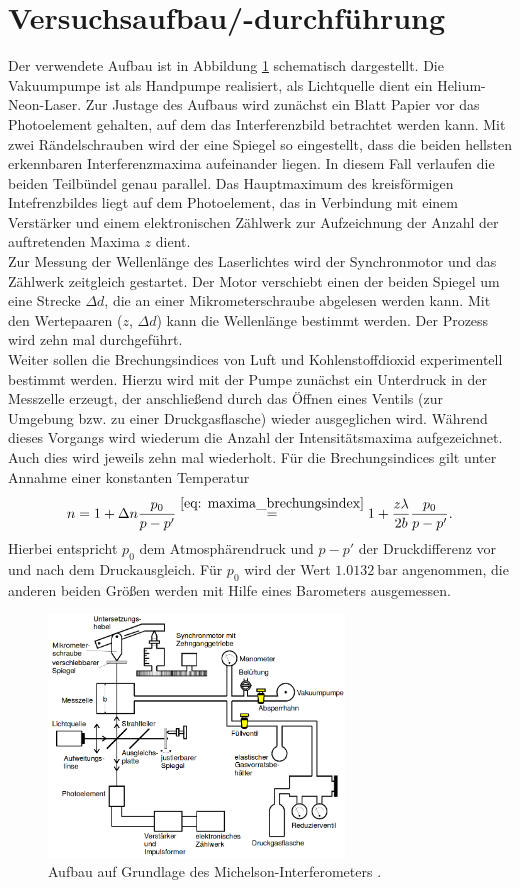\section{Versuchsaufbau/-durchführung}
Der verwendete Aufbau ist in Abbildung \ref{fig: aufbau} schematisch dargestellt. Die Vakuumpumpe ist als Handpumpe
realisiert, als Lichtquelle dient ein Helium-Neon-Laser. Zur Justage des Aufbaus wird zunächst ein Blatt Papier vor das Photoelement gehalten,
auf dem das Interferenzbild betrachtet werden kann. Mit zwei Rändelschrauben wird der eine Spiegel so eingestellt,  %
dass die beiden hellsten erkennbaren Interferenzmaxima
aufeinander liegen. In diesem Fall verlaufen die beiden Teilbündel genau parallel. Das Hauptmaximum des kreisförmigen Intefrenzbildes %
liegt auf dem Photoelement, das in Verbindung mit einem Verstärker und einem elektronischen Zählwerk zur Aufzeichnung der Anzahl
der auftretenden Maxima $z$ dient.\\
Zur Messung der Wellenlänge des Laserlichtes wird der Synchronmotor und das Zählwerk zeitgleich gestartet. Der Motor verschiebt einen
der beiden Spiegel um eine Strecke $\Delta d$, die an einer Mikrometerschraube abgelesen werden kann. Mit den Wertepaaren ($z$, $\Delta d$) kann
die Wellenlänge bestimmt werden. Der Prozess wird zehn mal durchgeführt. \\
Weiter sollen die Brechungsindices von Luft und Kohlenstoffdioxid experimentell bestimmt werden. Hierzu  wird mit der Pumpe zunächst ein Unterdruck
in der Messzelle erzeugt, der anschließend
durch das Öffnen eines Ventils (zur Umgebung bzw. zu einer Druckgasflasche) wieder ausgeglichen wird. Während dieses Vorgangs wird wiederum die
Anzahl der Intensitätsmaxima aufgezeichnet. Auch dies wird jeweils zehn mal wiederholt. Für die Brechungsindices gilt unter Annahme einer konstanten
Temperatur
\begin{equation}
  \label{eq: brechungsindex}
  n = 1 + \Delta n \frac{p_0}{p - p'} \overset{\eqref{eq: maxima_brechungsindex}}{=} 1 + \frac{z \lambda}{2b} \frac{p_0}{p - p'} .
\end{equation}
Hierbei entspricht $p_0$ dem Atmosphärendruck und $p - p'$ der Druckdifferenz vor und nach dem Druckausgleich. Für $p_0$ wird der Wert $\SI{1.0132}{\bar}$ angenommen,
die anderen beiden Größen werden mit Hilfe eines Barometers ausgemessen.
\begin{figure}
  \centering
  \includegraphics[width = 0.7\textwidth]{table/aufbau.png}
  \caption{Aufbau auf Grundlage des Michelson-Interferometers \cite{anleitung401}.}
  \label{fig: aufbau}
\end{figure}
